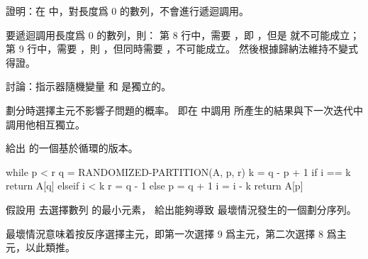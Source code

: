 \startsection[
  title={Selection in expected linear time},
  reference=section:selection_in_expected_linear_time,
]

\startEXERCISE
證明：在  中，對長度爲 0 的數列，不會進行遞迴調用。
\stopEXERCISE

\startANSWER
要遞迴調用長度爲 0 的數列，則：
\startigNum
\startitem
第 8 行中，需要 ，即 ，但是  就不可能成立；
\stopitem
\startitem
第 9 行中，需要 ，則 ，但同時需要 ，不可能成立。
\stopitem
\stopigNum
然後根據歸納法維持不變式得證。
\stopANSWER

\startEXERCISE
討論：指示器隨機變量  和  是獨立的。
\stopEXERCISE

\startANSWER
劃分時選擇主元不影響子問題的概率。
即在  中調用  所產生的結果與下一次迭代中調用他相互獨立。
\stopANSWER

\startEXERCISE
給出  的一個基於循環的版本。
\stopEXERCISE

\startANSWER
{}
\startCLRS
while p < r
	q = RANDOMIZED-PARTITION(A, p, r)
	k = q - p + 1
	if i == k
		return A[q]
	elseif i < k
		r = q - 1
	else
		p = q + 1
		i = i - k
return A[p]
\stopCLRS
\stopANSWER

\startEXERCISE
假設用  去選擇數列  的最小元素，
給出能夠導致  最壞情況發生的一個劃分序列。
\stopEXERCISE

\startANSWER
最壞情況意味着按反序選擇主元，即第一次選擇 9 爲主元，第二次選擇 8 爲主元，以此類推。
\stopANSWER

\stopsection
